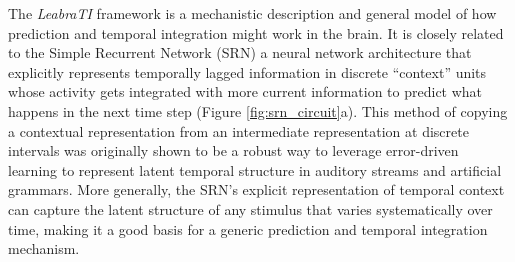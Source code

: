 \documentclass[dwyatte_dissertation.tex]{subfiles}
\begin{document}




The \textit{LeabraTI} framework is a mechanistic description and general model of how prediction and temporal integration might work in the brain. It is closely related to the Simple Recurrent Network (SRN) \cite{Elman90,Servan-SchreiberCleeremansMcClelland91}  a neural network architecture that explicitly represents temporally lagged information in discrete ``context'' units whose activity gets integrated with more current information to predict what happens in the next time step (Figure \ref{fig:srn_circuit}a). This method of copying a contextual representation from an intermediate representation at discrete intervals was originally shown to be a robust way to leverage error-driven learning to represent latent temporal structure in auditory streams and artificial grammars. More generally, the SRN's explicit representation of temporal context can capture the latent structure of any stimulus that varies systematically over time, making it a good basis for a generic prediction and temporal integration mechanism.
\end{document}
